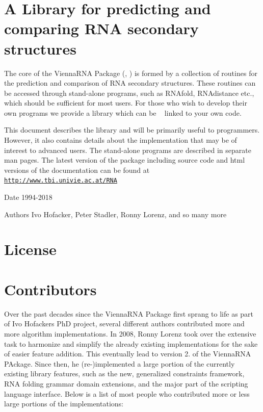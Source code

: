 \hypertarget{index_introduction}{}\section{A Library for predicting and comparing R\+N\+A secondary structures}\label{index_introduction}
The core of the Vienna\+R\+NA Package (\cite{lorenz:2011}, \cite{hofacker:1994}) is formed by a collection of routines for the prediction and comparison of R\+NA secondary structures. These routines can be accessed through stand-\/alone programs, such as {\ttfamily R\+N\+Afold}, {\ttfamily R\+N\+Adistance} etc., which should be sufficient for most users. For those who wish to develop their own programs we provide a library which can be ~\newline
linked to your own code.

This document describes the library and will be primarily useful to programmers. However, it also contains details about the implementation that may be of interest to advanced users. The stand-\/alone programs are described in separate man pages. The latest version of the package including source code and html versions of the documentation can be found at ~\newline
~\newline
 \href{http://www.tbi.univie.ac.at/RNA}{\tt http\+://www.\+tbi.\+univie.\+ac.\+at/\+R\+NA}

\begin{DoxyDate}{Date}
1994-\/2018 
\end{DoxyDate}
\begin{DoxyAuthor}{Authors}
Ivo Hofacker, Peter Stadler, Ronny Lorenz, and so many more
\end{DoxyAuthor}
\hypertarget{index_license}{}\section{License}\label{index_license}

\begin{DoxyVerbInclude}
\end{DoxyVerbInclude}
\hypertarget{index_contributors}{}\section{Contributors}\label{index_contributors}
Over the past decades since the {\ttfamily Vienna\+R\+NA Package} first sprang to life as part of Ivo Hofackers PhD project, several different authors contributed more and more algorithm implementations. In 2008, Ronny Lorenz took over the extensive task to harmonize and simplify the already existing implementations for the sake of easier feature addition. This eventually lead to version 2. of the {\ttfamily Vienna\+R\+NA P\+Ackage}. Since then, he (re-\/)implemented a large portion of the currently existing library features, such as the new, generalized constraints framework, R\+NA folding grammar domain extensions, and the major part of the scripting language interface. Below is a list of most people who contributed more or less large portions of the implementations\+:


